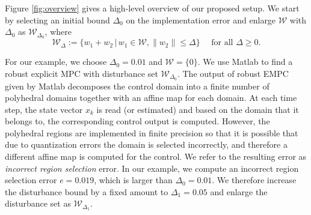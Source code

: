 
	
Figure \ref{fig:overview} gives a high-level overview of our proposed setup.
We start by selecting an initial bound $\Delta_0$ on the implementation error and enlarge $\mathcal W$ with $\Delta_0$ as $\mathcal W_{\Delta_0}$, where
\begin{equation}\label{eq:W_delta}
\mathcal W_{\Delta} := \{w_1+w_2 \,|\, w_1\in \mathcal W, \|w_2\|\le \Delta\}
\quad\text{ for all } \Delta\ge 0.
\end{equation}
 
For our example, we choose $\Delta_0=0.01$ and $\mathcal W = \{0\}$. 
We use Matlab to find a robust explicit MPC with disturbance set $\mathcal W_{\Delta_0}$. 
%
The output of robust EMPC given by Matlab decomposes the control domain into a
finite number of polyhedral domains together with an affine map for each domain. 
At each time step, the state vector $x_k$ is read (or estimated) and based on the domain
that it belongs to, the corresponding control output is computed. 
However, the polyhedral regions are implemented in finite precision so that
it is possible that due to quantization errors the domain is selected incorrectly, and therefore
a different affine map is computed for the control.
We refer to the resulting error as \emph{incorrect region selection} error.
In our example, we compute an incorrect region selection error $e = 0.019$, which is larger
than $\Delta_0=0.01$. We therefore increase the disturbance bound by a fixed amount to
$\Delta_1 = 0.05$ and enlarge the disturbance set as $\mathcal W_{\Delta_1}$. 

